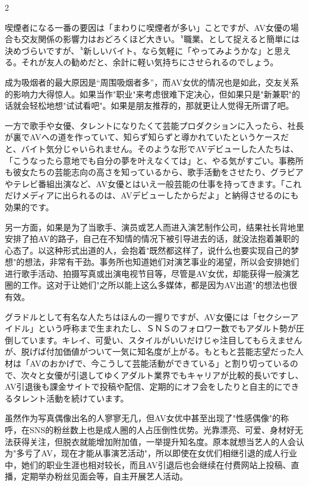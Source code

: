 \documentclass[12pt,UTF8]{ctexbook}
\begin{document}
\begin{paracol}{2}
\switchcolumn*

喫煙者になる一番の要因は「まわりに喫煙者が多い」ことですが、AV女優の場合も交友関係の影響力はおどろくほど大きい。〝職業〟として捉えると簡単には決めづらいですが、〝新しいバイト〟なら気軽に「やってみようかな」と思える。それが友人の勧めだと、余計に軽い気持ちにさせられるのでしょう。

\switchcolumn

成为吸烟者的最大原因是“周围吸烟者多”，而AV女优的情况也是如此，交友关系的影响力大得惊人。如果当作"职业"来考虑很难下定决心，但如果只是"新兼职"的话就会轻松地想"试试看吧"。如果是朋友推荐的，那就更让人觉得无所谓了吧。

\switchcolumn*

一方で歌手や女優、タレントになりたくて芸能プロダクションに入ったら、社長が裏でAVへの道を作っていて、知らず知らずと導かれていたというケースだと、バイト気分じゃいられません。そのような形でAVデビューした人たちは、「こうなったら意地でも自分の夢を叶えなくては」と、やる気がすごい。事務所も彼女たちの芸能志向の高さを知っているから、歌手活動をさせたり、グラビアやテレビ番組出演など、AV女優とはいえ一般芸能の仕事を持ってきます。「これだけメディアに出られるのは、AVデビューしたからだよ」と納得させるのにも効果的です。

\switchcolumn

另一方面，如果是为了当歌手、演员或艺人而进入演艺制作公司，结果社长背地里安排了拍AV的路子，自己在不知情的情况下被引导进去的话，就没法抱着兼职的心态了。以这种形式出道的人，会抱着"既然都这样了，说什么也要实现自己的梦想"的想法，非常有干劲。事务所也知道她们对演艺事业的渴望，所以会安排她们进行歌手活动、拍摄写真或出演电视节目等，尽管是AV女优，却能获得一般演艺圈的工作。这对于让她们"之所以能上这么多媒体，都是因为AV出道"的想法也很有效。

\switchcolumn*

グラドルとして有名な人たちはほんの一握りですが、AV女優には「セクシーアイドル」という呼称まで生まれたし、ＳＮＳのフォロワー数でもアダルト勢が圧倒しています。キレイ、可愛い、スタイルがいいだけじゃ注目してもらえませんが、脱げば付加価値がついて一気に知名度が上がる。もともと芸能志望だった人材は「AVのおかげで、今こうして芸能活動ができている」と割り切っているので、次々と女優が引退してゆくアダルト業界でもキャリアが比較的長いですし、AV引退後も課金サイトで投稿や配信、定期的にオフ会をしたりと自主的にできるタレント活動を続けています。

\switchcolumn

虽然作为写真偶像出名的人寥寥无几，但AV女优中甚至出现了"性感偶像"的称呼，在SNS的粉丝数上也是成人圈的人占压倒性优势。光靠漂亮、可爱、身材好无法获得关注，但脱衣就能增加附加值，一举提升知名度。原本就想当艺人的人会认为"多亏了AV，现在才能从事演艺活动"，所以即使在女优们相继引退的成人行业中，她们的职业生涯也相对较长，而且AV引退后也会继续在付费网站上投稿、直播，定期举办粉丝见面会等，自主开展艺人活动。


\end{paracol}
\end{document}
